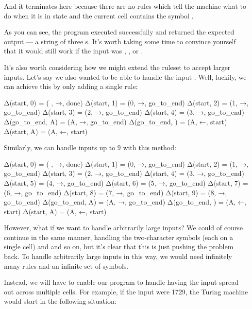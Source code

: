 And it terminates here because there are no rules which tell the machine what to do when it is in state  and the current cell contains the symbol .

As you can see, the program executed successfully and returned the expected output --- a string of three s. It's worth taking some time to convince yourself that it would still work if the input was , , or .

It's also worth considering how we might extend the ruleset to accept larger inputs. Let's say we also wanted to be able to handle the input . Well, luckily, we can achieve this by only adding a single rule:
\begin{stdout}
Δ(start, 0) = ( , →, done) 
Δ(start, 1) = (0, →, go_to_end)
Δ(start, 2) = (1, →, go_to_end)
Δ(start, 3) = (2, →, go_to_end)
Δ(start, 4) = (3, →, go_to_end)
Δ(go_to_end, A) = (A, →, go_to_end)
Δ(go_to_end, ) = (A, ←, start)
Δ(start, A) = (A, ←, start)
\end{stdout}
Similarly, we can handle inputs up to 9 with this method:
\begin{stdout}
Δ(start, 0) = ( , →, done) 
Δ(start, 1) = (0, →, go_to_end)
Δ(start, 2) = (1, →, go_to_end)
Δ(start, 3) = (2, →, go_to_end)
Δ(start, 4) = (3, →, go_to_end)
Δ(start, 5) = (4, →, go_to_end)
Δ(start, 6) = (5, →, go_to_end)
Δ(start, 7) = (6, →, go_to_end)
Δ(start, 8) = (7, →, go_to_end)
Δ(start, 9) = (8, →, go_to_end)
Δ(go_to_end, A) = (A, →, go_to_end)
Δ(go_to_end, ) = (A, ←, start)
Δ(start, A) = (A, ←, start)
\end{stdout}

However, what if we want to handle arbitrarily large inputs? We could of course continue in the same manner, handling the two-character symbols (each on a single cell)  and  and so on, but it's clear that this is just pushing the problem back. To handle arbitrarily large inputs in this way, we would need infinitely many rules and an infinite set of symbols.

Instead, we will have to enable our program to handle having the input spread out across multiple cells. For example, if the input were 1729, the Turing machine would start in the following situation:


